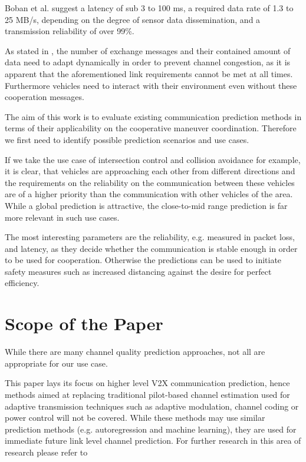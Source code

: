 \documentclass{IEEEtran}
\begin{document}
Boban et al. \cite{bobanConnectedRoadsFuture2018} suggest a latency of sub 3 to 100 ms, a required data rate of 1.3 to 25 MB/s, depending on the degree of sensor data dissemination, and a transmission reliability of over 99\%.

As stated in \cite{llatserCooperativeAutomatedDriving2019}, the number of exchange messages and their contained amount of data need to adapt dynamically in order to prevent channel congestion, as it is apparent that the aforementioned link requirements cannot be met at all times. Furthermore vehicles need to interact with their environment even without these cooperation messages.

The aim of this work is to evaluate existing communication prediction methods in terms of their applicability on the cooperative maneuver coordination. Therefore we first need to identify possible prediction scenarios and use cases.

If we take the use case of intersection control and collision avoidance for example, it is clear, that vehicles are approaching each other from different directions and the requirements on the reliability on the communication between these vehicles are of a higher priority than the communication with other vehicles of the area. While a global prediction is attractive, the close-to-mid range prediction is far more relevant in such use cases. 

The most interesting parameters are the reliability, e.g. measured in packet loss, and latency, as they decide whether the communication is stable enough in order to be used for cooperation. Otherwise the predictions can be used to initiate safety measures such as increased distancing against the desire for perfect efficiency.

\section{Scope of the Paper}
While there are many channel quality prediction approaches, not all are appropriate for our use case.

This paper lays its focus on higher level V2X communication prediction, hence methods aimed at replacing traditional pilot-based channel estimation used for adaptive transmission techniques such as adaptive modulation, channel coding or power control will not be covered.
While these methods may use similar prediction methods (e.g. autoregression and machine learning), they are used for immediate future link level channel prediction.
For further research in this area of research please refer to \cite{semmelrodtInvestigationDifferentFading2003,duel-hallenFadingChannelPrediction2007,wongJointChannelEstimation2005,wongWLC435LowComplexityAdaptive2006,vaughanShorttermMobileChannel2000}
\end{document}
